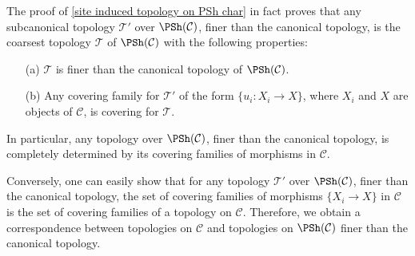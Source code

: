 \begin{remark}\label{site topology on PSh finer than canonical char}
The proof of \cref{site induced topology on PSh char} in fact proves that any subcanonical topology $\mathcal{T}'$ over $\PSh(\mathcal{C})$, finer than the canonical topology, is the coarsest topology $\mathcal{T}$ of $\PSh(\mathcal{C})$ with the following properties:
\begin{itemize}
\item[(a)] $\mathcal{T}$ is finer than the canonical topology of $\PSh(\mathcal{C})$.
\item[(b)] Any covering family for $\mathcal{T}'$ of the form $\{u_i:X_i\to X\}$, where $X_i$ and $X$ are objects of $\mathcal{C}$, is covering for $\mathcal{T}$.
\end{itemize}
In particular, any topology over $\PSh(\mathcal{C})$, finer than the canonical topology, is completely determined by its covering families of morphisms in $\mathcal{C}$.\par
Conversely, one can easily show that for any topology $\mathcal{T}'$ over $\PSh(\mathcal{C})$, finer than the canonical topology, the set of covering families of morphisms $\{X_i\to X\}$ in $\mathcal{C}$ is the set of covering families of a topology on $\mathcal{C}$. Therefore, we obtain a correspondence between topologies on $\mathcal{C}$ and topologies on $\PSh(\mathcal{C})$ finer than the canonical topology.
\end{remark}

